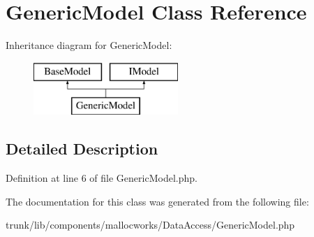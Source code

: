 \hypertarget{class_utopia_1_1_components_1_1_model_1_1_generic_model}{
\section{GenericModel Class Reference}
\label{class_utopia_1_1_components_1_1_model_1_1_generic_model}
}
Inheritance diagram for GenericModel:\begin{figure}[H]
\begin{center}
\leavevmode
\includegraphics[height=2.000000cm]{class_utopia_1_1_components_1_1_model_1_1_generic_model}
\end{center}
\end{figure}


\subsection{Detailed Description}


Definition at line 6 of file GenericModel.php.



The documentation for this class was generated from the following file:\begin{DoxyCompactItemize}
\item 
trunk/lib/components/mallocworks/DataAccess/GenericModel.php\end{DoxyCompactItemize}
